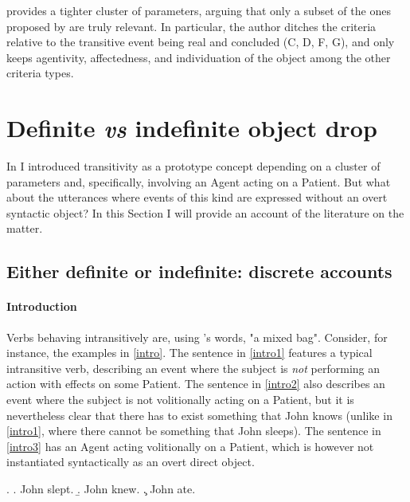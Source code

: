 \textcite[78]{Lorenzetti2008} provides a tighter cluster of parameters, arguing that only a subset of the ones proposed by \textcite{HopperThompson1980} are truly relevant. In particular, the author ditches the criteria relative to the transitive event being real and concluded (C, D, F, G), and only keeps agentivity, affectedness, and individuation of the object among the other criteria types.


\section{Definite \textit{vs} indefinite object drop} 

In  I introduced transitivity as a prototype concept depending on a cluster of parameters and, specifically, involving an Agent acting on a Patient. But what about the utterances where events of this kind are expressed without an overt syntactic object? In this Section I will provide an account of the literature on the matter.

\subsection{Either definite or indefinite: discrete accounts} 

\paragraph{Introduction}
Verbs behaving intransitively are, using \textcite[191]{rutherford1998workbook}'s words, "a mixed bag". Consider, for instance, the examples in \ref{intro}. The sentence in \ref{intro1} features a typical intransitive verb, describing an event where the subject is \textit{not} performing an action with effects on some Patient. The sentence in \ref{intro2} also describes an event where the subject is not volitionally acting on a Patient, but it is nevertheless clear that there has to exist something that John knows (unlike in \ref{intro1}, where there cannot be something that John sleeps). The sentence in \ref{intro3} has an Agent acting volitionally on a Patient, which is however not instantiated syntactically as an overt direct object.

\ex. \label{intro} \a. \label{intro1} John slept.
\b. \label{intro2} John knew.
\c. \label{intro3} John ate.


